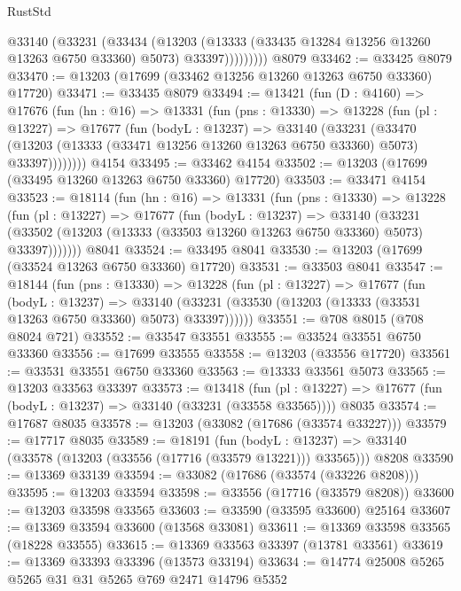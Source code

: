 \begin{lexlean}{RustStd}
\begin{coremodule}
              @33140
                (@33231
                  (@33434
                    (@13203
                      (@13333 (@33435 @13284 @13256 @13260 @13263 @6750 @33360) @5073)
                      @33397)))))))))
    @8079
@33462 := @33425 @8079
@33470 := @13203 (@17699 (@33462 @13256 @13260 @13263 @6750 @33360) @17720)
@33471 := @33435 @8079
@33494 := @13421
    (fun (D : @4160) =>
    @17676
      (fun (hn : @16) =>
      @13331
        (fun (pns : @13330) =>
        @13228
          (fun (pl : @13227) =>
          @17677
            (fun (bodyL : @13237) =>
            @33140
              (@33231
                (@33470
                  (@13203 (@13333 (@33471 @13256 @13260 @13263 @6750 @33360) @5073) @33397))))))))
    @4154
@33495 := @33462 @4154
@33502 := @13203 (@17699 (@33495 @13260 @13263 @6750 @33360) @17720)
@33503 := @33471 @4154
@33523 := @18114
    (fun (hn : @16) =>
    @13331
      (fun (pns : @13330) =>
      @13228
        (fun (pl : @13227) =>
        @17677
          (fun (bodyL : @13237) =>
          @33140
            (@33231 (@33502 (@13203 (@13333 (@33503 @13260 @13263 @6750 @33360) @5073) @33397)))))))
    @8041
@33524 := @33495 @8041
@33530 := @13203 (@17699 (@33524 @13263 @6750 @33360) @17720)
@33531 := @33503 @8041
@33547 := @18144
    (fun (pns : @13330) =>
    @13228
      (fun (pl : @13227) =>
      @17677
        (fun (bodyL : @13237) =>
        @33140 (@33231 (@33530 (@13203 (@13333 (@33531 @13263 @6750 @33360) @5073) @33397))))))
@33551 := @708 @8015 (@708 @8024 @721)
@33552 := @33547 @33551
@33555 := @33524 @33551 @6750 @33360
@33556 := @17699 @33555
@33558 := @13203 (@33556 @17720)
@33561 := @33531 @33551 @6750 @33360
@33563 := @13333 @33561 @5073
@33565 := @13203 @33563 @33397
@33573 := @13418
    (fun (pl : @13227) => @17677 (fun (bodyL : @13237) => @33140 (@33231 (@33558 @33565))))
    @8035
@33574 := @17687 @8035
@33578 := @13203 (@33082 (@17686 (@33574 @33227)))
@33579 := @17717 @8035
@33589 := @18191
    (fun (bodyL : @13237) => @33140 (@33578 (@13203 (@33556 (@17716 (@33579 @13221))) @33565)))
    @8208
@33590 := @13369 @33139
@33594 := @33082 (@17686 (@33574 (@33226 @8208)))
@33595 := @13203 @33594
@33598 := @33556 (@17716 (@33579 @8208))
@33600 := @13203 @33598 @33565
@33603 := @33590 (@33595 @33600) @25164
@33607 := @13369 @33594 @33600 (@13568 @33081)
@33611 := @13369 @33598 @33565 (@18228 @33555)
@33615 := @13369 @33563 @33397 (@13781 @33561)
@33619 := @13369 @33393 @33396 (@13573 @33194)
@33634 := @14774
    @25008
    @5265
    @5265
    @31
    @31
    @5265
    @769
    @2471
    @14796
    @5352

\end{coremodule}
\end{lexlean}
